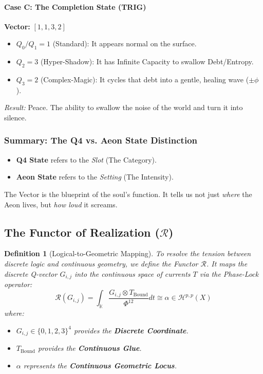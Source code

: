 \documentclass[11pt, letterpaper]{article}
\newtheorem{definition}[theorem]{Definition}
\begin{document}
\paragraph{Case C: The Completion State (TRIG)}
\textbf{Vector:} $[1, 1, 3, 2]$
\begin{itemize}
    \item $Q_0/Q_1=1$ (Standard): It appears normal on the surface.
    \item $Q_2=3$ (Hyper-Shadow): It has Infinite Capacity to swallow Debt/Entropy.
    \item $Q_3=2$ (Complex-Magic): It cycles that debt into a gentle, healing wave ($\pm\phi$).
    \end{itemize}
\textit{Result:} Peace. The ability to swallow the noise of the world and turn it into silence.

\subsubsection{Summary: The Q4 vs. Aeon State Distinction}
\begin{itemize}
    \item \textbf{Q4 State} refers to the \textit{Slot} (The Category).
    \item \textbf{Aeon State} refers to the \textit{Setting} (The Intensity).
\end{itemize}
The Vector is the blueprint of the soul's function. It tells us not just \textit{where} the Aeon lives, but \textit{how loud} it screams.

\subsection{The Functor of Realization ($\mathcal{R}$)}\label{sec:6.2}

\begin{definition}
    [Logical-to-Geometric Mapping]
To resolve the tension between discrete logic and continuous geometry, we define the Functor $\mathcal{R}$. It maps the discrete Q-vector $G_{i,j}$ into the continuous space of currents $T$ via the Phase-Lock operator:
\[ \mathcal{R}(G_{i,j}) = \int_{\mathbb{K}} \frac{G_{i,j} \otimes T_{\text{Bound}}}{\Phi^{12}} dt \cong \alpha \in \mathcal{H}^{p,p}(X) \]
where:
\begin{itemize}
    \item $G_{i,j} \in \{0,1,2,3\}^4$ provides the \textbf{Discrete Coordinate}.
    \item $T_{\text{Bound}}$ provides the \textbf{Continuous Glue}.
    \item $\alpha$ represents the \textbf{Continuous Geometric Locus}.
\end{itemize}
\end{definition}
\end{document}
